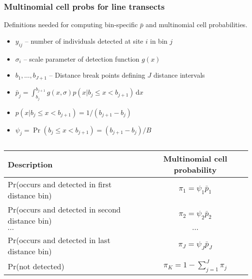 \documentclass[color=usenames,dvipsnames]{beamer}\usepackage[]{graphicx}\usepackage[]{color}
\begin{document}
\begin{frame}
  \frametitle{Multinomial cell probs for line transects}
  \small
  Definitions needed for computing \alert{bin-specific} $\bar{p}$ and
  multinomial cell probabilities. 
  \begin{itemize}
  \small
    \setlength\itemsep{1pt}
    \item $y_{ij}$ -- number of individuals detected at site $i$ in bin $j$
    \item $\sigma_i$ -- scale parameter of detection function $g(x)$
    \item $b_1, \dots, b_{J+1}$ -- Distance break points defining $J$ distance intervals
    \item $\bar{p}_j = \int_{b_j}^{b_{j+1}} g(x,\sigma)p(x|b_j\le x<b_{j+1})\, \mathrm{d}x$
    \item $p(x|b_j\le x<b_{j+1}) = 1/(b_{j+1}-b_j)$
    \item $\psi_j=\Pr(b_j\le x<b_{j+1})=(b_{j+1}-b_j)/B$ %
  \end{itemize}
  \pause \vfill
  \footnotesize
  \begin{columns}
    \column{0.9\paperwidth}
    \begin{tabular}{lc}
      \hline
      \centering
      Description                       & Multinomial cell probability \\
      \hline
      Pr(occurs and detected in first distance bin)  & $\pi_1 = \psi_1\bar{p}_1$   \\
      Pr(occurs and detected in second distance bin)  & $\pi_2 = \psi_2\bar{p}_2$   \\
      {\centering $\cdots$}             & $\cdots$                     \\
      Pr(occurs and detected in last distance bin)  & $\pi_J = \psi_J\bar{p}_J$   \\
      Pr(not detected)                  & $\pi_{K} = 1-\sum_{j=1}^J \pi_j$          \\
      \hline
    \end{tabular}
  \end{columns}
\end{frame}
\end{document}
